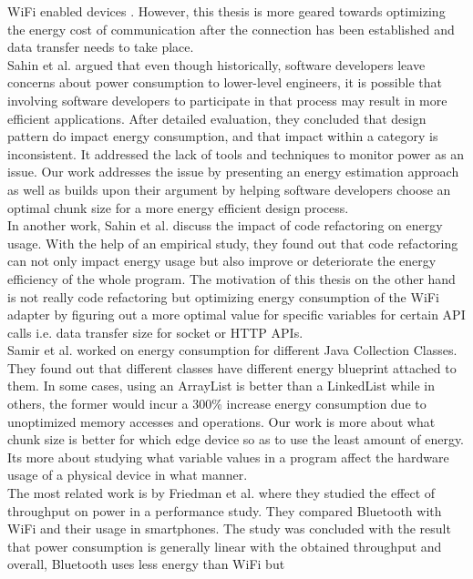 WiFi enabled devices \cite{4292824}. However, this thesis is more geared towards optimizing the energy cost of 
communication after the connection has been established and data transfer needs to take place. \\
Sahin et al. \cite{6224257} argued that even though historically, software developers leave concerns about power consumption 
to lower-level engineers, it is possible that involving software developers to participate in that process may result 
in more efficient applications. After detailed evaluation, they concluded that design pattern do impact energy consumption, and 
that impact within a category is inconsistent. It addressed the lack of tools and techniques to monitor power as an issue. Our 
work addresses the issue by presenting an energy estimation approach as well as builds upon their argument by helping 
software developers choose an optimal chunk size for a more energy efficient design process. \\
In another work, Sahin et al. \cite{10.1145/2652524.2652538} discuss the impact of code refactoring on energy usage. 
With the help of an empirical study, they found out that code refactoring can not only impact energy usage but also 
improve or deteriorate the energy efficiency of the whole program. The motivation of this thesis on the other hand is 
not really code refactoring but optimizing energy consumption of the WiFi adapter by figuring out a more optimal value for 
specific variables for certain API calls i.e. data transfer size for socket or HTTP APIs. \\
Samir et al. \cite{7886906} worked on energy consumption for different Java Collection Classes. They found 
out that different classes have different energy blueprint attached to them. In some cases, using an ArrayList is better than 
a LinkedList while in others, the former would incur a 300\% increase energy consumption due to unoptimized memory accesses 
and operations. Our work is more about what chunk size is better for which edge device so as to use the least amount of 
energy. Its more about studying what variable values in a program affect the hardware usage of a physical device in what manner. \\
The most related work is by Friedman et al. \cite{6200281} where they studied the effect of throughput on power in a 
performance study. They compared Bluetooth with WiFi and their usage in smartphones. The study was concluded with the result 
that power consumption is generally linear with the obtained throughput and overall, Bluetooth uses less energy than WiFi but 
